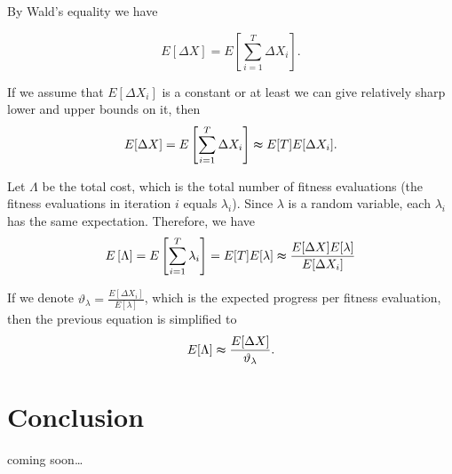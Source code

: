 \documentclass[12pt, a4paper]{article}
\theoremstyle{remark}
\newcommand{\cm}{coming soon\dots}
\begin{document}
By Wald's equality we have

\[
    E[\Delta X] = E\left[\sum_{i = 1}^{T} \Delta X_i\right].
\]

If we assume that $E[\Delta X_i]$ is a constant or at least we can give relatively sharp lower and upper bounds on it, then
\[
    E[\Delta X] = E\left[\sum_{i = 1}^{T} \Delta X_i\right] \thickapprox E[T] E[\Delta X_i].
\]

Let $\Lambda$ be the total cost, which is the total number of fitness evaluations (the fitness evaluations in iteration $i$ equals $\lambda_i$). Since $\lambda$ is a random variable, each $\lambda_i$ has the same expectation. Therefore, we have
\[
    E\left[\Lambda\right] = E\left[\sum_{i = 1}^{T} \lambda_i\right] = E[T] E[\lambda] \thickapprox \frac{E[\Delta X] E[\lambda]}{E[\Delta X_i]}
\]

If we denote $\vartheta_\lambda = \frac{E[\Delta X_i]}{E[\lambda]}$, which is the expected progress per fitness evaluation, then the previous equation is simplified to
\[
    E[\Lambda] \thickapprox \frac{E[\Delta X]}{\vartheta_\lambda}.
\]

\section{Conclusion}
\cm




\end{document}
